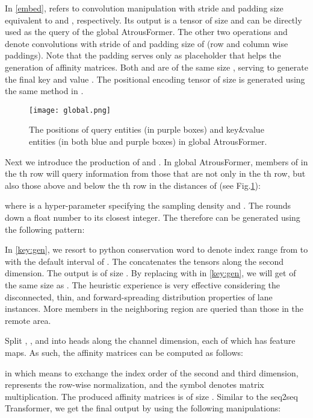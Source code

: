 \documentclass[preprint,12pt,review]{elsarticle}
\begin{document}
In \eqref{embed},  refers to  convolution manipulation with stride and padding size equivalent to  and , respectively. Its output  is a tensor of size  and can be directly used as the query of the global AtrousFormer. The other two operations  and  denote  convolutions with stride of  and padding size of  (row and column wise paddings). Note that the padding serves only as placeholder that helps the generation of affinity matrices. Both  and  are of the same size , serving to generate the final key  and value . The positional encoding tensor  of size  is generated using the same method in \cite{transformer}. 

\begin{figure}[tbp]
	\centering
	\texttt{[image: global.png]}
	\caption{The positions of query entities (in purple boxes) and key\&value entities (in both blue and purple boxes) in global AtrousFormer.}
	\label{fig:att}
\end{figure}


Next we introduce the production of  and . In global AtrousFormer, members of  in the th row will query information from those that are not only in the th row, but also those above and below the th row in the distances of  (see Fig.\ref{fig:att}):

where  is a hyper-parameter specifying the sampling density and . The  rounds down a float number to its closest integer. The  therefore can be generated using the following pattern:


In \eqref{key:gen}, we resort to python conservation word  to denote index range from  to  with the default interval of . The  concatenates the tensors along the second dimension. The output  is of size . By replacing  with  in \eqref{key:gen}, we will get  of the same size as . The heuristic experience is very effective considering the disconnected, thin, and forward-spreading distribution properties of lane instances. More members in the neighboring region are queried than those in the remote area.


Split , , and  into  heads along the channel dimension, each of which has  feature maps. As such, the affinity matrices can be computed as follows:

in which  means to exchange the index order of the second and third dimension,  represents the row-wise normalization, and the symbol  denotes matrix multiplication. The produced affinity matrices  is of size . Similar to the seq2seq Transformer, we get the final output by using the following manipulations:
\end{document}
